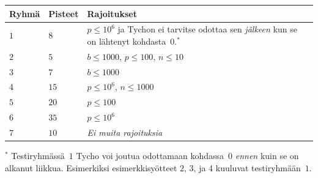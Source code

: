 \medskip
\begin{tabular}{lll}
Ryhmä & Pisteet & Rajoitukset \\\hline
  $1$ & $8$  & $p\leq 10^6$ 
  ja Tychon ei tarvitse odottaa sen \emph{jälkeen} kun se on lähtenyt kohdasta~$0$.$^*$ \\ %
  $2$ & $5$  & $b\leq 1000$, $p\leq 100$, $n\leq 10$ \\
  $3$ & $7$  & $b\leq 1000$ \\
  $4$ & $15$ & $p\leq 10^6$, $n\leq 1000$\\
  $5$ & $20$ & $p\leq 100$\\
  $6$ & $35$ & $p\leq 10^6$\\
  $7$ & $10$ & \emph{Ei muita rajoituksia}
\end{tabular}

\medskip
\noindent $^*$ Testiryhmässä~$1$ Tycho 
voi joutua odottamaan kohdassa~$0$ \emph{ennen} kuin se on alkanut liikkua.
Esimerkiksi esimerkkisyötteet $2$, $3$, ja $4$ kuuluvat testiryhmään~$1$.
